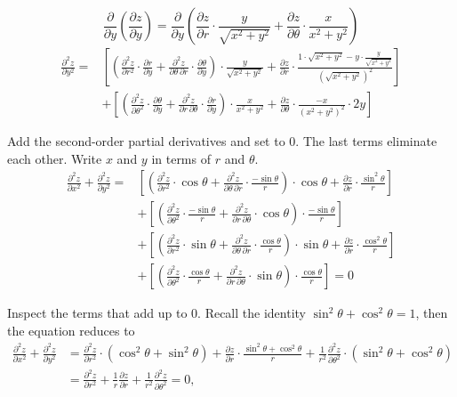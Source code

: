 \documentclass[a4paper, 12pt]{article}
\begin{document}
\begin{enumerate}[leftmargin=*,label=\textbf{\arabic*.}]
\[\frac{\partial}{\partial y}\left(\frac{\partial z}{\partial y}\right)=\frac{\partial}{\partial y}\left(\frac{\partial z}{\partial r}\cdot\frac{y}{\sqrt{x^2+y^2}}+\frac{\partial z}{\partial \theta}\cdot\frac{x}{x^2+y^2}\right)\]
\vspace{-1em}
\begin{align*}\frac{\partial^2z}{\partial y^2}=&\left[\left(\frac{\partial^2z}{\partial r^2}\cdot\frac{\partial r}{\partial y}+\frac{\partial^2 z}{\partial\theta\,\partial r}\cdot\frac{\partial\theta}{\partial y}\right)\cdot\frac{y}{\sqrt{x^2+y^2}}+\frac{\partial z}{\partial r}\cdot\frac{1\cdot\sqrt{x^2+y^2}-y\cdot\frac{y}{\sqrt{x^2+y^2}}}{\left(\sqrt{x^2+y^2}\right)^2}\right]\\[1em]&+\left[\left(\frac{\partial^2z}{\partial \theta^2}\cdot\frac{\partial \theta}{\partial y}+\frac{\partial^2 z}{\partial r\,\partial \theta}\cdot\frac{\partial r}{\partial y}\right)\cdot\frac{x}{x^2+y^2}+\frac{\partial z}{\partial\theta}\cdot\frac{-x}{(x^2+y^2)^2}\cdot2y\right]\end{align*}

Add the second-order partial derivatives and set to $0$. The last terms eliminate each other. Write $x$ and $y$ in terms of $r$ and $\theta$.
\begin{align*}\frac{\partial^2 z}{\partial x^2}+\frac{\partial^2 z}{\partial y^2}=&\left[\left(\frac{\partial^2z}{\partial r^2}\cdot\cos\theta +\frac{\partial^2z}{\partial\theta\,\partial r}\cdot\frac{-\sin\theta}{r}\right)\cdot\cos\theta+\frac{\partial z}{\partial r}\cdot\frac{\sin^2\theta}{r}\right]\\[1em]&+\left[\left(\frac{\partial^2z}{\partial\theta^2}\cdot\frac{-\sin\theta}{r} + \frac{\partial^2z}{\partial r\,\partial\theta}\cdot\cos\theta\right)\cdot\frac{-\sin\theta}{r}\right]\\[1em]&+\left[\left(\frac{\partial^2z}{\partial r^2}\cdot\sin\theta +\frac{\partial^2z}{\partial\theta\,\partial r}\cdot\frac{\cos\theta}{r}\right)\cdot\sin\theta+\frac{\partial z}{\partial r}\cdot\frac{\cos^2\theta}{r}\right]\\[1em]&+\left[\left(\frac{\partial^2z}{\partial\theta^2}\cdot\frac{\cos\theta}{r} + \frac{\partial^2z}{\partial r\,\partial\theta}\cdot\sin\theta\right)\cdot\frac{\cos\theta}{r}\right]=0\end{align*}

Inspect the terms that add up to $0$. Recall the identity $\sin^2\theta+\cos^2\theta=1$, then the equation reduces to
\begin{align*}
\frac{\partial^2z}{\partial x^2}+\frac{\partial^2z}{\partial y^2}&=\frac{\partial^2z}{\partial r^2}\cdot\left(\cos^2\theta+\sin^2\theta\right)+\frac{\partial z}{\partial r}\cdot\frac{\sin^2\theta+\cos^2\theta}{r}+\frac1{r^2}\frac{\partial^2z}{\partial\theta^2}\cdot\left(\sin^2\theta+\cos^2\theta\right)\\[1em]&=\boxed{\frac{\partial^2z}{\partial r^2}+\frac1r\frac{\partial z}{\partial r}+\frac1{r^2}\frac{\partial^2z}{\partial\theta^2}=0},
\end{align*}


\end{enumerate}
\end{document}
